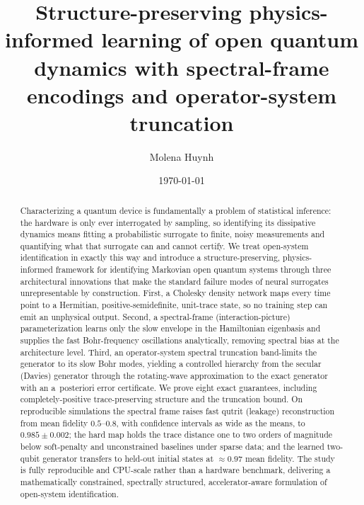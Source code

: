 \documentclass[twocolumn,aps,prxquantum,superscriptaddress,nofootinbib,floatfix,longbibliography]{revtex4-2}
\newcommand{\sync}[1]{#1}
\begin{document}
\title{Structure-preserving physics-informed learning of open quantum dynamics with spectral-frame encodings and operator-system truncation}

\author{Molena Huynh}

\date{\today}

\begin{abstract}
Characterizing a quantum device is fundamentally a problem of statistical inference: the hardware is only ever interrogated by sampling, so identifying its dissipative dynamics means fitting a probabilistic surrogate to finite, noisy measurements and quantifying what that surrogate can and cannot certify. We treat open-system identification in exactly this way and introduce a structure-preserving, physics-informed framework for identifying Markovian open quantum systems through three architectural innovations that make the standard failure modes of neural surrogates unrepresentable by construction. First, a Cholesky density network maps every time point to a Hermitian, positive-semidefinite, unit-trace state, so no training step can emit an unphysical output. Second, a spectral-frame (interaction-picture) parameterization learns only the slow envelope in the Hamiltonian eigenbasis and supplies the fast Bohr-frequency oscillations analytically, removing spectral bias at the architecture level. Third, an operator-system spectral truncation band-limits the generator to its slow Bohr modes, yielding a controlled hierarchy from the secular (Davies) generator through the rotating-wave approximation to the exact generator with an a~posteriori error certificate. We prove eight exact guarantees, including completely-positive trace-preserving structure and the truncation bound. On reproducible simulations the spectral frame raises fast qutrit (leakage) reconstruction from mean fidelity $0.5$--$0.8$, with confidence intervals as wide as the means, to $\sync{0.985}\pm\sync{0.002}$; the hard map holds the trace distance one to two orders of magnitude below soft-penalty and unconstrained baselines under sparse data; and the learned two-qubit generator transfers to held-out initial states at $\approx0.97$ mean fidelity. The study is fully reproducible and CPU-scale rather than a hardware benchmark, delivering a mathematically constrained, spectrally structured, accelerator-aware formulation of open-system identification.
\end{abstract}
\end{document}
